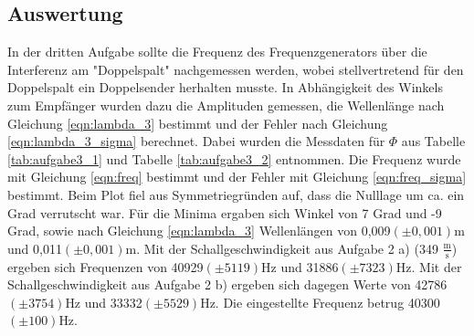 \documentclass[12pt]{scrartcl}
\begin{document}
\subsection{Auswertung}
In der dritten Aufgabe sollte die Frequenz des Frequenzgenerators über die Interferenz am "Doppelspalt" nachgemessen werden, wobei stellvertretend für den Doppelspalt ein Doppelsender herhalten musste. In Abhängigkeit des Winkels zum Empfänger wurden dazu die Amplituden gemessen, die Wellenlänge nach Gleichung \ref{eqn:lambda_3} bestimmt und der Fehler nach Gleichung \ref{eqn:lambda_3_sigma} berechnet. Dabei wurden die Messdaten für $\Phi$ aus Tabelle \ref{tab:aufgabe3_1} und Tabelle \ref{tab:aufgabe3_2} entnommen. Die Frequenz wurde mit Gleichung \ref{eqn:freq} bestimmt und der Fehler mit Gleichung \ref{eqn:freq_sigma} bestimmt. Beim Plot fiel aus Symmetriegründen auf, dass die Nulllage um ca. ein Grad verrutscht war. Für die Minima ergaben sich Winkel von 7 Grad und -9 Grad, sowie nach Gleichung \ref{eqn:lambda_3} Wellenlängen von 0,009$(\pm 0,001)$m und 0,011$(\pm 0,001)$m. Mit der Schallgeschwindigkeit aus Aufgabe 2 a) (349 $\frac{\text{m}}{\text{s}}$) ergeben sich Frequenzen von 40929$(\pm 5119)$Hz und 31886$(\pm 7323)$Hz. Mit der Schallgeschwindigkeit aus Aufgabe 2 b) ergeben sich dagegen Werte von 42786$(\pm 3754)$Hz und 33332$(\pm 5529)$Hz. Die eingestellte Frequenz betrug 40300$(\pm100)$Hz.
\end{document}

